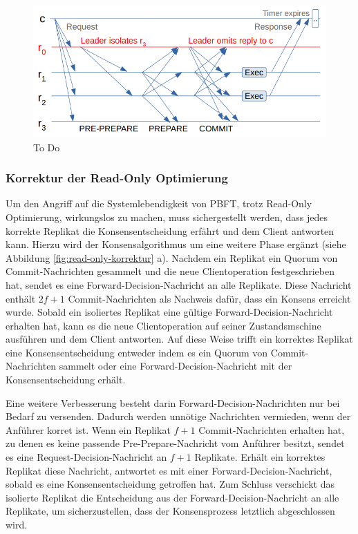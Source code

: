 \documentclass[nonacm,sigconf,natbib=false]{acmart}
\begin{document}
\begin{figure}
  \centering
  \includegraphics[width=\linewidth]{read-only-problem.png}
  \caption{To Do}
  \label{fig:read-only-problem}
\end{figure}

\subsubsection{Korrektur der Read-Only Optimierung}

Um den Angriff auf die Systemlebendigkeit von PBFT, trotz Read-Only Optimierung, wirkungslos zu machen, muss sichergestellt werden, dass jedes korrekte Replikat die Konsensentscheidung erfährt und dem Client antworten kann. Hierzu wird der Konsensalgorithmus um eine weitere Phase ergänzt (siehe Abbildung \ref{fig:read-only-korrektur} a). Nachdem ein Replikat ein Quorum von Commit-Nachrichten gesammelt und die neue Clientoperation festgeschrieben hat, sendet es eine Forward-Decision-Nachricht an alle Replikate. Diese Nachricht enthält $2f+1$ Commit-Nachrichten als Nachweis dafür, dass ein Konsens erreicht wurde. Sobald ein isoliertes Replikat eine gültige Forward-Decision-Nachricht erhalten hat, kann es die neue Clientoperation auf seiner Zustandsmschine ausführen und dem Client antworten. Auf diese Weise trifft ein korrektes Replikat eine Konsensentscheidung entweder indem es ein Quorum von Commit-Nachrichten sammelt oder eine Forward-Decision-Nachricht mit der Konsensentscheidung erhält.

Eine weitere Verbesserung besteht darin Forward-Decision-Nachrichten nur bei Bedarf zu versenden. Dadurch werden unnötige Nachrichten vermieden, wenn der Anführer korret ist. Wenn ein Replikat $f+1$ Commit-Nachrichten erhalten hat, zu denen es keine passende Pre-Prepare-Nachricht vom Anführer besitzt, sendet es eine Request-Decision-Nachricht an $f+1$ Replikate. Erhält ein korrektes Replikat diese Nachricht, antwortet es mit einer Forward-Decision-Nachricht, sobald es eine Konsensentscheidung getroffen hat. Zum Schluss verschickt das isolierte Replikat die Entscheidung aus der Forward-Decision-Nachricht an alle Replikate, um sicherzustellen, dass der Konsensprozess letztlich abgeschlossen wird.
\end{document}
